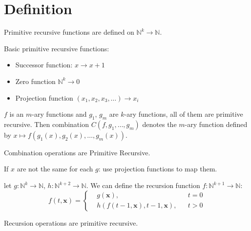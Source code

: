 \section{Definition}

Primitive recursive functions are defined on
\(\mathbb{N}^k \rightarrow \mathbb{N}\).

Basic primitive recursive functions:

\begin{itemize}
\item
  Successor function: \(x \rightarrow x+1\)
\item
  Zero function \(\mathbb{N}^k \rightarrow 0\)
\item
  Projection function \((x_1, x_2, x_3, \dots) \rightarrow x_i\)
\end{itemize}

\begin{definition}[Combination]
\(f\) is an \(m\)-ary functions and \(g_1\), \(g_m\) are
\(k\)-ary functions, all of them are primitive recursive. Then
combination \(C(f,g_1,\dots,g_m)\) denotes the \(m\)-ary function
defined by \(x \mapsto f(g_1(x), g_2(x), \dots, g_m(x))\).
\end{definition}

Combination operations are Primitive Recursive.

If \(x\) are not the same for each \(g\): use projection functions to map them.

\begin{definition}[Recursion]
let \(g: \mathbb{N}^k \rightarrow \mathbb{N}\),
\(h: \mathbb{N}^{k+2} \rightarrow \mathbb{N}\). We can define the
recursion function \(f: \mathbb{N}^{k+1} \rightarrow \mathbb{N}\):
$$
f(t,\mathbf{x}) = \left\{\begin{aligned}& g(\mathbf{x}), && t = 0\\
& h(f(t-1,\mathbf{x}), t-1, \mathbf{x}), && t > 0
\end{aligned}
\right.
$$
\end{definition}

Recursion operations are primitive recursive.
